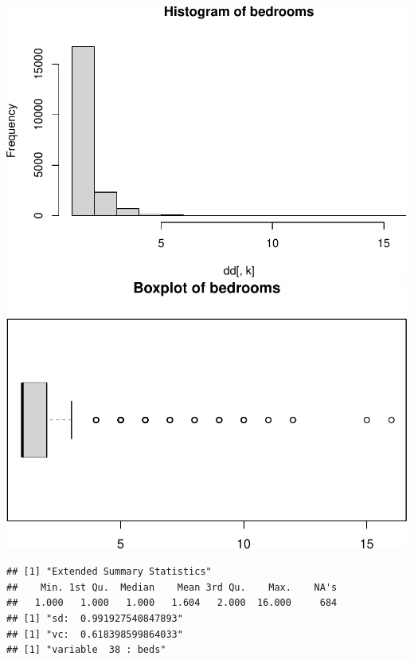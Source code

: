 \includegraphics{anal_files/figure-latex/unnamed-chunk-7-22.pdf}
\includegraphics{anal_files/figure-latex/unnamed-chunk-7-23.pdf}

\begin{verbatim}
## [1] "Extended Summary Statistics"
##    Min. 1st Qu.  Median    Mean 3rd Qu.    Max.    NA's 
##   1.000   1.000   1.000   1.604   2.000  16.000     684 
## [1] "sd:  0.991927540847893"
## [1] "vc:  0.618398599864033"
## [1] "variable  38 : beds"
\end{verbatim}

